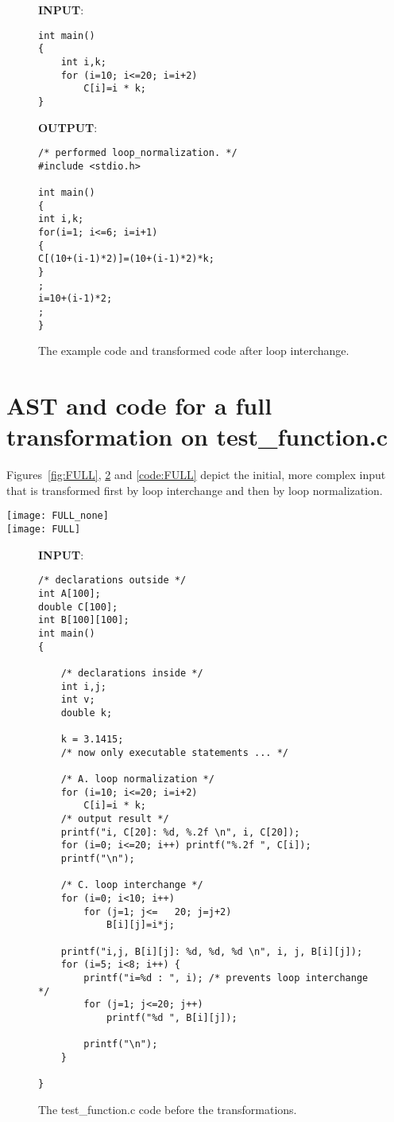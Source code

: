 \documentclass{scrartcl}
\begin{document}
\begin{figure}
\centering
\textbf{INPUT}:
\begin{lstlisting}
int main()
{
	int i,k;
	for (i=10; i<=20; i=i+2)
		C[i]=i * k;
}
\end{lstlisting}
\textbf{OUTPUT}:
\begin{lstlisting}
/* performed loop_normalization. */
#include <stdio.h>

int main()
{
int i,k;
for(i=1; i<=6; i=i+1)
{
C[(10+(i-1)*2)]=(10+(i-1)*2)*k;
}
;
i=10+(i-1)*2;
;
}
\end{lstlisting}
\caption{The example code and transformed code after loop interchange.}
\label{code:LN}
\end{figure}

\section{AST and code for a full transformation on test\_function.c}
Figures~\ref{fig:FULL}, \ref{code:FULL_none} and \ref{code:FULL} depict the initial, more complex input that is transformed first by loop interchange and then by loop normalization.

\begin{sidewaysfigure}
\centering
\texttt{[image: FULL\_none]}
\vspace{.2cm}\\
\texttt{[image: FULL]}
\caption{Loop interchange with consecutive loop normalization of a more complex example. The top tree is the initial tree, the bottom tree is the result after the transformations.}
\label{fig:FULL}
\end{sidewaysfigure}


\begin{figure}
\centering
\textbf{INPUT}:
\begin{lstlisting}
/* declarations outside */
int A[100];
double C[100];
int B[100][100];
int main()
{

	/* declarations inside */
	int i,j;
	int v;
	double k;

	k = 3.1415;
	/* now only executable statements ... */

	/* A. loop normalization */
	for (i=10; i<=20; i=i+2)
		C[i]=i * k;
	/* output result */
	printf("i, C[20]: %d, %.2f \n", i, C[20]);
	for (i=0; i<=20; i++) printf("%.2f ", C[i]);
	printf("\n");

	/* C. loop interchange */
	for (i=0; i<10; i++) 
		for (j=1; j<=	20; j=j+2)
			B[i][j]=i*j;

	printf("i,j, B[i][j]: %d, %d, %d \n", i, j, B[i][j]);
	for (i=5; i<8; i++) {
		printf("i=%d : ", i); /* prevents loop interchange */
		for (j=1; j<=20; j++)
			printf("%d ", B[i][j]);
		
		printf("\n");
	}

}
\end{lstlisting}
\caption{The test\_function.c code before the transformations.}
\label{code:FULL_none}
\end{figure}
\end{document}

